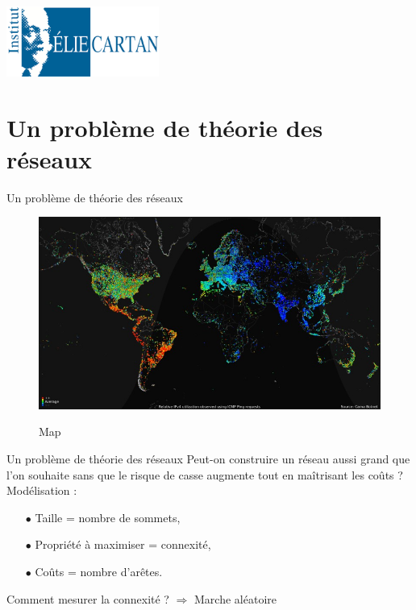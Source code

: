 \begin{frame}
  \titlepage
\begin{center}\includegraphics[width=5cm]{IECL.png}\end{center}
\end{frame}

\section{Un problème de théorie des réseaux}

\begin{frame}{Un problème de théorie des réseaux}
\begin{figure}
\href{run:InternetMap2012Full.avi}{\includegraphics[scale=0.35]{InternetMap2012.jpg}} 
\caption{Map}
\end{figure}
\end{frame}

\begin{frame}{Un problème de théorie des réseaux}
Peut-on construire un réseau aussi grand que l'on souhaite sans que le risque de casse augmente tout en maîtrisant les coûts ?\\
Modélisation :\\
\begin{itemize}
\item[$\bullet$] Taille = nombre de sommets,
\item[$\bullet$] Propriété à maximiser = connexité,
\item[$\bullet$] Coûts = nombre d'arêtes.
\end{itemize}
Comment mesurer la connexité ? $\Rightarrow$ Marche aléatoire
\end{frame}

